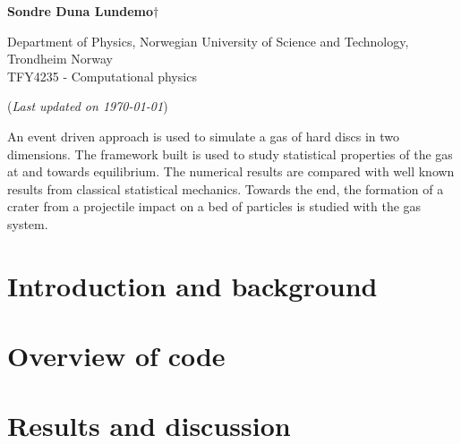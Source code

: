 


	
\begin{titlepage}
	\begin{center}
	\setlength{\parskip}{0em}
	\thispagestyle{titlepage}
	

	\vspace{4mm}
	
	\large{\textbf{Sondre Duna Lundemo}}$\dagger$
	
	\normalsize{Department of Physics, Norwegian University of Science and Technology, Trondheim Norway \\
	TFY4235 - Computational physics
	}

	(\textit{Last updated on \today})
	\end{center}

	\setlength{\parindent}{2em}An event driven approach is used to simulate a gas of hard discs in two dimensions. The framework built is used to study statistical properties of the gas at and towards equilibrium. The numerical results are compared with well known results from classical statistical mechanics. Towards the end, the formation of a crater from a projectile impact on a bed of particles is studied with the gas system. 
	
	\begin{figure}
		
	\end{figure}
	

\end{titlepage}

\newpage
\setlength{\parskip}{0em}
\tableofcontents
\setlength{\parskip}{1em}
\newpage

\section{Introduction and background}\label{sec:intro}



\section{Overview of code}\label{sec:overview}



\section{Results and discussion}

